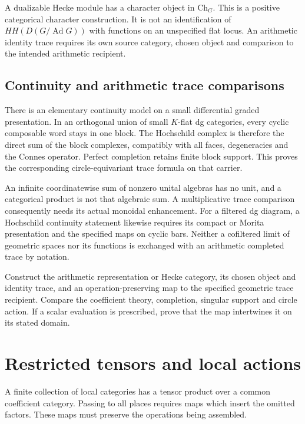 A dualizable Hecke module has a character object in
\(\mathrm{Ch}_G\).
This is a positive categorical character construction.
It is not an identification of \(HH(D(G/\operatorname{Ad}G))\)
with functions on an unspecified flat locus.
An arithmetic identity trace requires its own source category,
chosen object and comparison to the intended arithmetic recipient.

\subsection{Continuity and arithmetic trace comparisons}

There is an elementary continuity model on a small differential
graded presentation. In an orthogonal union of small \(K\)-flat
dg categories, every cyclic composable word stays in one block.
The Hochschild complex is therefore the direct sum of the block
complexes, compatibly with all faces, degeneracies and the
Connes operator. Perfect completion retains finite block support.
This proves the corresponding circle-equivariant trace formula
on that carrier.

An infinite coordinatewise sum of nonzero unital algebras has
no unit, and a categorical product is not that algebraic sum.
A multiplicative trace comparison consequently needs its
actual monoidal enhancement.
For a filtered dg diagram, a Hochschild continuity statement
likewise requires its compact or Morita presentation and the
specified maps on cyclic bars.
Neither a cofiltered limit of geometric spaces nor its functions
is exchanged with an arithmetic completed trace by notation.

\begin{question}\label{v4-arith:ic:trace-comparison}
Construct the arithmetic representation or Hecke category,
its chosen object and identity trace, and an operation-preserving
map to the specified geometric trace recipient.
Compare the coefficient theory, completion, singular support and
circle action. If a scalar evaluation is prescribed, prove that
the map intertwines it on its stated domain.
\end{question}


\section{Restricted tensors and local actions}
\label{v4-arith:ic:restricted-tensors}

A finite collection of local categories has a tensor product over
a common coefficient category. Passing to all places requires maps
which insert the omitted factors. These maps must preserve the
operations being assembled.

